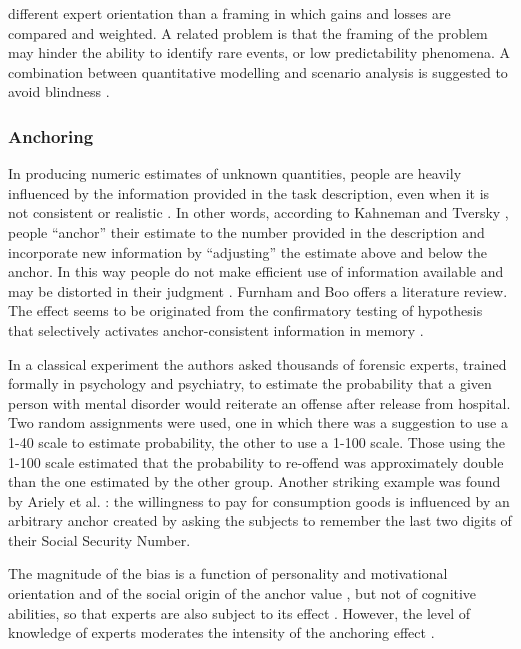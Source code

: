 \documentclass[]{book}
\theoremstyle{definition}
\theoremstyle{definition}
\theoremstyle{definition}
\theoremstyle{remark}
\begin{document}
different expert orientation than a framing in which gains and losses
are compared and weighted. A related problem is that the framing of the
problem may hinder the ability to identify rare events, or low
predictability phenomena. A combination between quantitative modelling
and scenario analysis is suggested to avoid blindness
\citep{makridakis2009forecasting}.

\subsubsection*{Anchoring}\label{anchoring}

In producing numeric estimates of unknown quantities, people are heavily
influenced by the information provided in the task description, even
when it is not consistent or realistic \citep{gigerenzer2015calculated}.
In other words, according to Kahneman and Tversky
\citep{tversky1974judgment}, people ``anchor'' their estimate to the
number provided in the description and incorporate new information by
``adjusting'' the estimate above and below the anchor. In this way
people do not make efficient use of information available and may be
distorted in their judgment \citep{thorsteinson2008anchoring}. Furnham
and Boo \citep{furnham2011literature} offers a literature review. The
effect seems to be originated from the confirmatory testing of
hypothesis that selectively activates anchor-consistent information in
memory \citep{block1991overconfidence, chapman1999anchoring}.

In a classical experiment \citep{slovic2000violence} the authors asked
thousands of forensic experts, trained formally in psychology and
psychiatry, to estimate the probability that a given person with mental
disorder would reiterate an offense after release from hospital. Two
random assignments were used, one in which there was a suggestion to use
a 1-40 scale to estimate probability, the other to use a 1-100 scale.
Those using the 1-100 scale estimated that the probability to re-offend
was approximately double than the one estimated by the other group.
Another striking example was found by Ariely et al.
\citep{ariely2003coherent}: the willingness to pay for consumption goods
is influenced by an arbitrary anchor created by asking the subjects to
remember the last two digits of their Social Security Number.

The magnitude of the bias is a function of personality and motivational
orientation \citep{eroglu2010biases} and of the social origin of the
anchor value \citep{meub2015anchoring}, but not of cognitive abilities,
so that experts are also subject to its effect
\citep{mussweiler2000numeric, oechssler2009cognitive, bergman2010anchoring}.
However, the level of knowledge of experts moderates the intensity of
the anchoring effect \citep{wilson1996new, smith2013knowledge}.
\end{document}
